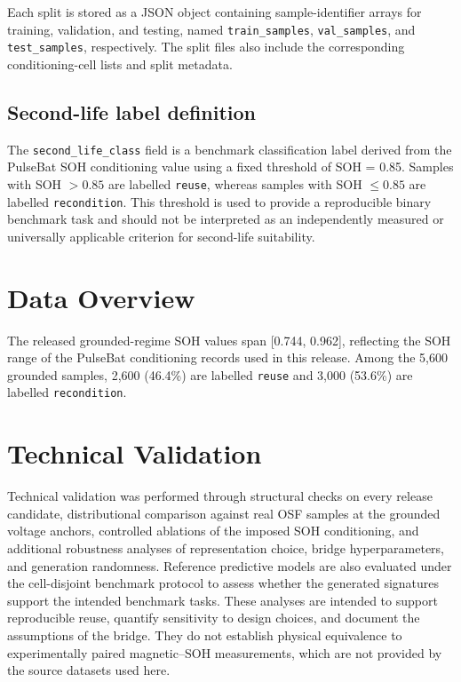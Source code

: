 \documentclass[11pt]{article}
\begin{document}
Each split is stored as a JSON object containing sample-identifier arrays
for training, validation, and testing, named \texttt{train\_samples},
\texttt{val\_samples}, and \texttt{test\_samples}, respectively. The split
files also include the corresponding conditioning-cell lists and split
metadata.

\subsection*{Second-life label definition}

The \texttt{second\_life\_class} field is a benchmark classification label
derived from the PulseBat SOH conditioning value using a fixed threshold of
SOH = 0.85. Samples with SOH $> 0.85$ are labelled \texttt{reuse}, whereas
samples with SOH $\leq 0.85$ are labelled \texttt{recondition}. This threshold
is used to provide a reproducible binary benchmark task and should not be
interpreted as an independently measured or universally applicable criterion
for second-life suitability.

\section*{Data Overview}

The released grounded-regime SOH values span [0.744, 0.962], reflecting the
SOH range of the PulseBat conditioning records used in this release. Among
the 5,600 grounded samples, 2,600 (46.4\%) are labelled \texttt{reuse} and
3,000 (53.6\%) are labelled \texttt{recondition}. 

\section*{Technical Validation}

Technical validation was performed through structural checks on every release
candidate, distributional comparison against real OSF samples at the grounded
voltage anchors, controlled ablations of the imposed SOH conditioning, and
additional robustness analyses of representation choice, bridge
hyperparameters, and generation randomness. Reference predictive models are
also evaluated under the cell-disjoint benchmark protocol to assess whether
the generated signatures support the intended benchmark tasks. These analyses
are intended to support reproducible reuse, quantify sensitivity to design
choices, and document the assumptions of the bridge. They do not establish
physical equivalence to experimentally paired magnetic--SOH measurements,
which are not provided by the source datasets used here.
\end{document}
